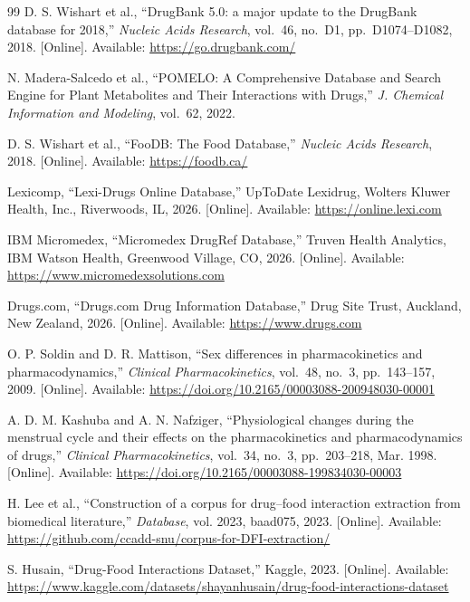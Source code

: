 \begin{thebibliography}{99}
D. S. Wishart et al.,
``DrugBank 5.0: a major update to the DrugBank database for 2018,''
\textit{Nucleic Acids Research}, vol.~46, no.~D1, pp.~D1074--D1082, 2018.
[Online]. Available: \url{https://go.drugbank.com/}

N. Madera-Salcedo et al.,
``POMELO: A Comprehensive Database and Search Engine for Plant Metabolites and Their Interactions with Drugs,''
\textit{J. Chemical Information and Modeling}, vol.~62, 2022.

D. S. Wishart et al.,
``FooDB: The Food Database,''
\textit{Nucleic Acids Research}, 2018.
[Online]. Available: \url{https://foodb.ca/}

Lexicomp,
``Lexi-Drugs Online Database,''
UpToDate Lexidrug, Wolters Kluwer Health, Inc., Riverwoods, IL, 2026.
[Online]. Available: \url{https://online.lexi.com}

IBM Micromedex,
``Micromedex DrugRef Database,''
Truven Health Analytics, IBM Watson Health, Greenwood Village, CO, 2026.
[Online]. Available: \url{https://www.micromedexsolutions.com}

Drugs.com,
``Drugs.com Drug Information Database,''
Drug Site Trust, Auckland, New Zealand, 2026.
[Online]. Available: \url{https://www.drugs.com}

O. P. Soldin and D. R. Mattison,
``Sex differences in pharmacokinetics and pharmacodynamics,''
\textit{Clinical Pharmacokinetics}, vol.~48, no.~3, pp.~143--157, 2009.
[Online]. Available: \url{https://doi.org/10.2165/00003088-200948030-00001}

A. D. M. Kashuba and A. N. Nafziger,
``Physiological changes during the menstrual cycle and their effects on the pharmacokinetics and pharmacodynamics of drugs,''
\textit{Clinical Pharmacokinetics}, vol.~34, no.~3, pp.~203--218, Mar. 1998.
[Online]. Available: \url{https://doi.org/10.2165/00003088-199834030-00003}

H. Lee et al.,
``Construction of a corpus for drug–food interaction extraction from biomedical literature,''
\textit{Database}, vol. 2023, baad075, 2023.
[Online]. Available: \url{https://github.com/ccadd-snu/corpus-for-DFI-extraction/}

S. Husain,
``Drug-Food Interactions Dataset,''
Kaggle, 2023.
[Online]. Available: \url{https://www.kaggle.com/datasets/shayanhusain/drug-food-interactions-dataset}


\end{thebibliography}
